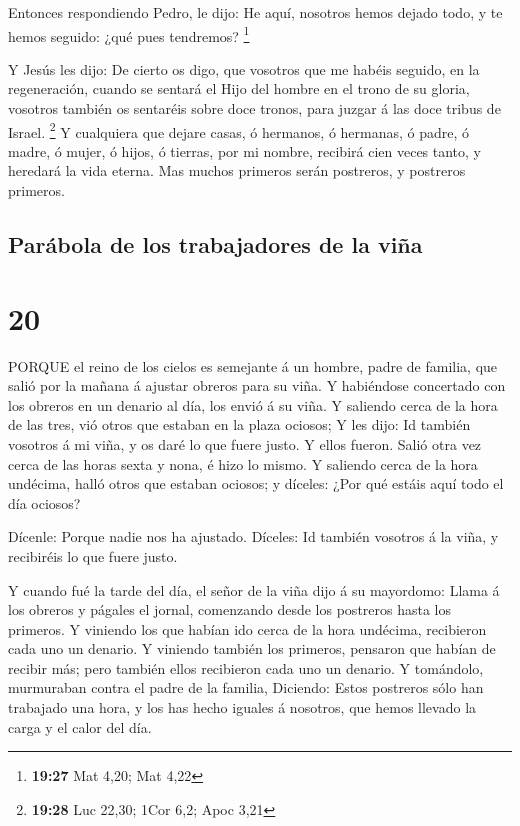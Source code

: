  Entonces respondiendo Pedro, le dijo: He aquí, nosotros
hemos dejado todo, y te hemos seguido: ¿qué pues tendremos? \footnote{\textbf{19:27}
  Mat 4,20; Mat 4,22}

 Y Jesús les dijo: De cierto os digo, que vosotros que me
habéis seguido, en la regeneración, cuando se sentará el Hijo del hombre
en el trono de su gloria, vosotros también os sentaréis sobre doce
tronos, para juzgar á las doce tribus de Israel. \footnote{\textbf{19:28}
  Luc 22,30; 1Cor 6,2; Apoc 3,21}  Y cualquiera que dejare
casas, ó hermanos, ó hermanas, ó padre, ó madre, ó mujer, ó hijos, ó
tierras, por mi nombre, recibirá cien veces tanto, y heredará la vida
eterna.  Mas muchos primeros serán postreros, y postreros
primeros.

\hypertarget{paruxe1bola-de-los-trabajadores-de-la-viuxf1a}{%
\subsection{Parábola de los trabajadores de la
viña}\label{paruxe1bola-de-los-trabajadores-de-la-viuxf1a}}

\hypertarget{section-19}{%
\section{20}\label{section-19}}

 PORQUE el reino de los cielos es semejante á un hombre,
padre de familia, que salió por la mañana á ajustar obreros para su
viña.  Y habiéndose concertado con los obreros en un denario
al día, los envió á su viña.  Y saliendo cerca de la hora de
las tres, vió otros que estaban en la plaza ociosos;  Y les
dijo: Id también vosotros á mi viña, y os daré lo que fuere justo. Y
ellos fueron.  Salió otra vez cerca de las horas sexta y
nona, é hizo lo mismo.  Y saliendo cerca de la hora
undécima, halló otros que estaban ociosos; y díceles: ¿Por qué estáis
aquí todo el día ociosos?

 Dícenle: Porque nadie nos ha ajustado. Díceles: Id también
vosotros á la viña, y recibiréis lo que fuere justo.

 Y cuando fué la tarde del día, el señor de la viña dijo á
su mayordomo: Llama á los obreros y págales el jornal, comenzando desde
los postreros hasta los primeros.  Y viniendo los que habían
ido cerca de la hora undécima, recibieron cada uno un denario.
 Y viniendo también los primeros, pensaron que habían de
recibir más; pero también ellos recibieron cada uno un denario.
 Y tomándolo, murmuraban contra el padre de la familia,
 Diciendo: Estos postreros sólo han trabajado una hora, y
los has hecho iguales á nosotros, que hemos llevado la carga y el calor
del día.

